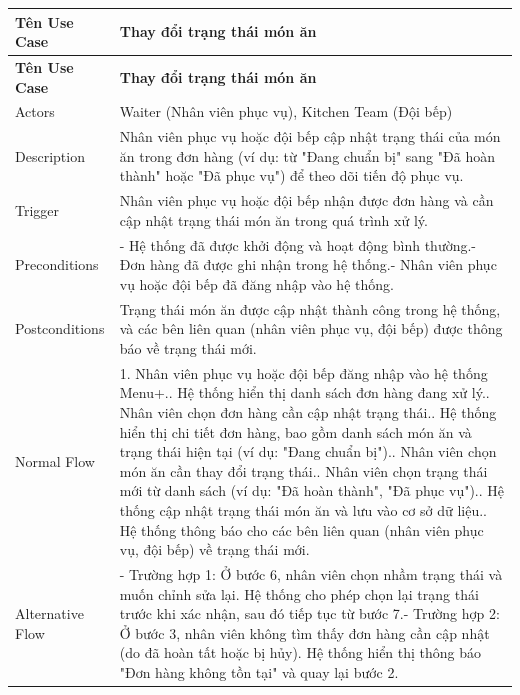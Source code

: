 \begin{itemize}
        \begin{longtable}{|p{3cm}|p{12cm}|}
        \hline
        \textbf{Tên Use Case} & \textbf{Thay đổi trạng thái món ăn} \\ 
        \hline
        \endfirsthead
        \hline
        \textbf{Tên Use Case} & \textbf{Thay đổi trạng thái món ăn} \\ 
        \endhead
        \hline
        \endfoot
        \hline
        \endlastfoot
        Actors & Waiter (Nhân viên phục vụ), Kitchen Team (Đội bếp) \\ 
        \hline
        Description & Nhân viên phục vụ hoặc đội bếp cập nhật trạng thái của món ăn trong đơn hàng (ví dụ: từ "Đang chuẩn bị" sang "Đã hoàn thành" hoặc "Đã phục vụ") để theo dõi tiến độ phục vụ. \\
        \hline
        Trigger & Nhân viên phục vụ hoặc đội bếp nhận được đơn hàng và cần cập nhật trạng thái món ăn trong quá trình xử lý. \\
        \hline
        Preconditions & - Hệ thống đã được khởi động và hoạt động bình thường.\newline- Đơn hàng đã được ghi nhận trong hệ thống.\newline- Nhân viên phục vụ hoặc đội bếp đã đăng nhập vào hệ thống. \\
        \hline
        Postconditions & Trạng thái món ăn được cập nhật thành công trong hệ thống, và các bên liên quan (nhân viên phục vụ, đội bếp) được thông báo về trạng thái mới. \\
        \hline
        Normal Flow & 1. Nhân viên phục vụ hoặc đội bếp đăng nhập vào hệ thống Menu+.\newline2. Hệ thống hiển thị danh sách đơn hàng đang xử lý.\newline3. Nhân viên chọn đơn hàng cần cập nhật trạng thái.\newline4. Hệ thống hiển thị chi tiết đơn hàng, bao gồm danh sách món ăn và trạng thái hiện tại (ví dụ: "Đang chuẩn bị").\newline5. Nhân viên chọn món ăn cần thay đổi trạng thái.\newline6. Nhân viên chọn trạng thái mới từ danh sách (ví dụ: "Đã hoàn thành", "Đã phục vụ").\newline7. Hệ thống cập nhật trạng thái món ăn và lưu vào cơ sở dữ liệu.\newline8. Hệ thống thông báo cho các bên liên quan (nhân viên phục vụ, đội bếp) về trạng thái mới. \\
        \hline
        Alternative Flow & - Trường hợp 1: Ở bước 6, nhân viên chọn nhầm trạng thái và muốn chỉnh sửa lại. Hệ thống cho phép chọn lại trạng thái trước khi xác nhận, sau đó tiếp tục từ bước 7.\newline- Trường hợp 2: Ở bước 3, nhân viên không tìm thấy đơn hàng cần cập nhật (do đã hoàn tất hoặc bị hủy). Hệ thống hiển thị thông báo "Đơn hàng không tồn tại" và quay lại bước 2. \\

\end{longtable}
\end{itemize}
